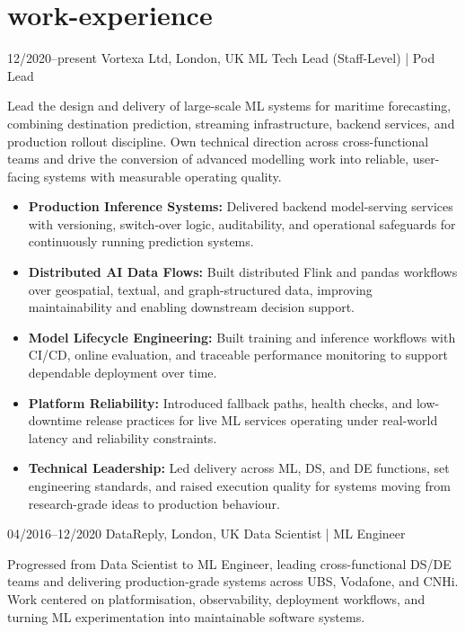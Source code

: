 \documentclass[]{../../friggeri-cv}
\begin{document}
\section{work-experience}
\begin{entrylist}
	\entry
	{\footnotesize 12/2020–present}
	{Vortexa Ltd, London, UK}
	{ML Tech Lead (Staff-Level) | Pod Lead}
	{
    	{\small
	    \setlength{\parindent}{-1.5em}
    	\setlength{\leftskip}{-1.5em}
	    Lead the design and delivery of large-scale ML systems for maritime forecasting, combining destination prediction, streaming infrastructure, backend services, and production rollout discipline. Own technical direction across cross-functional teams and drive the conversion of advanced modelling work into reliable, user-facing systems with measurable operating quality.

    	}
	    \begin{itemize}[left=-1.5em]
    	    \item \footnotesize\textbf{Production Inference Systems:} Delivered backend model-serving services with versioning, switch-over logic, auditability, and operational safeguards for continuously running prediction systems.
	        \item \footnotesize\textbf{Distributed AI Data Flows:} Built distributed Flink and pandas workflows over geospatial, textual, and graph-structured data, improving maintainability and enabling downstream decision support.
		        \item \footnotesize\textbf{Model Lifecycle Engineering:} Built training and inference workflows with CI/CD, online evaluation, and traceable performance monitoring to support dependable deployment over time.
	        \item \footnotesize\textbf{Platform Reliability:} Introduced fallback paths, health checks, and low-downtime release practices for live ML services operating under real-world latency and reliability constraints.
	        \item \footnotesize\textbf{Technical Leadership:} Led delivery across ML, DS, and DE functions, set engineering standards, and raised execution quality for systems moving from research-grade ideas to production behaviour.
    	\end{itemize}
	}
    \entry
    {\footnotesize 04/2016–12/2020}
    {DataReply, London, UK}
    {Data Scientist | ML Engineer}
    {
        {\small
        \setlength{\parindent}{-1.5em}
        \setlength{\leftskip}{-1.5em}
        Progressed from Data Scientist to ML Engineer, leading cross-functional DS/DE teams and delivering production-grade systems across UBS, Vodafone, and CNHi. Work centered on platformisation, observability, deployment workflows, and turning ML experimentation into maintainable software systems.

}}
\end{entrylist}
\end{document}

